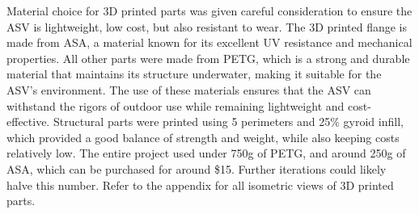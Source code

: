 Material choice for 3D printed parts was given careful consideration to ensure the ASV is lightweight, low cost, but also resistant to wear. The 3D printed flange is made from ASA, a material known for its excellent UV resistance and mechanical properties. All other parts were made from PETG, which is a strong and durable material that maintains its structure underwater, making it suitable for the ASV's environment. The use of these materials ensures that the ASV can withstand the rigors of outdoor use while remaining lightweight and cost-effective. Structural parts were printed using 5 perimeters and 25\% gyroid infill, which provided a good balance of strength and weight, while also keeping costs relatively low. The entire project used under 750g of PETG, and around 250g of ASA, which can be purchased for around \$15. Further iterations could likely halve this number. Refer to the appendix for all isometric views of 3D printed parts.
